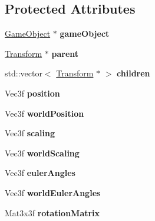 \subsection*{Protected Attributes}
\begin{DoxyCompactItemize}
\item 
\hypertarget{class_transform_aeae6186d24a6968ab1cc423e6275edd0}{
\hyperlink{class_game_object}{GameObject} $\ast$ {\bfseries gameObject}}
\label{class_transform_aeae6186d24a6968ab1cc423e6275edd0}

\item 
\hypertarget{class_transform_aa1e92491c9905869a108ec09a08e5eb4}{
\hyperlink{class_transform}{Transform} $\ast$ {\bfseries parent}}
\label{class_transform_aa1e92491c9905869a108ec09a08e5eb4}

\item 
\hypertarget{class_transform_aba90cae9b61c6c614cd7b1a8151c24bd}{
std::vector$<$ \hyperlink{class_transform}{Transform} $\ast$ $>$ {\bfseries children}}
\label{class_transform_aba90cae9b61c6c614cd7b1a8151c24bd}

\item 
\hypertarget{class_transform_ade2b0121437dc8ffe92136d6d3592963}{
Vec3f {\bfseries position}}
\label{class_transform_ade2b0121437dc8ffe92136d6d3592963}

\item 
\hypertarget{class_transform_aefb83556a032d9ac4b76a9510461788a}{
Vec3f {\bfseries worldPosition}}
\label{class_transform_aefb83556a032d9ac4b76a9510461788a}

\item 
\hypertarget{class_transform_a06b04127dae94305ef74104aba545cbb}{
Vec3f {\bfseries scaling}}
\label{class_transform_a06b04127dae94305ef74104aba545cbb}

\item 
\hypertarget{class_transform_aa0fc7b67266edf8c8d7f62b534dee695}{
Vec3f {\bfseries worldScaling}}
\label{class_transform_aa0fc7b67266edf8c8d7f62b534dee695}

\item 
\hypertarget{class_transform_a6f903ef4b633f5efb267d422aa5c20fb}{
Vec3f {\bfseries eulerAngles}}
\label{class_transform_a6f903ef4b633f5efb267d422aa5c20fb}

\item 
\hypertarget{class_transform_ad18dc47412fadd14c60be416f030970c}{
Vec3f {\bfseries worldEulerAngles}}
\label{class_transform_ad18dc47412fadd14c60be416f030970c}

\item 
\hypertarget{class_transform_ad44aa94578d6f80d135b879add5eda1d}{
Mat3x3f {\bfseries rotationMatrix}}
\label{class_transform_ad44aa94578d6f80d135b879add5eda1d}


\end{DoxyCompactItemize}
